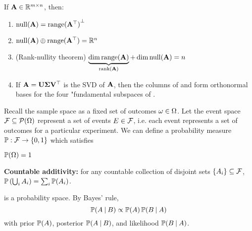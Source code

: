 \documentclass{article}
\begin{document}
\begin{solution}
    \begin{theorem}
    If $\mathbf{A} \in \mathbb{R}^{m \times n}$, then:
    \begin{enumerate}
        \item $\operatorname{null}(\mathbf{A}) = {\operatorname{range}({\mathbf{A}}^\top)}^\bot$
        \item $\operatorname{null}(\mathbf{A}) \mathbin{\oplus} \operatorname{range}({\mathbf{A}}^\top) = \mathbb{R}^n$
        \item (Rank-nullity theorem) $\underbrace{\dim \operatorname{range}(\mathbf{A})}_{\operatorname{rank}(\mathbf{A})} + \dim \operatorname{null}(\mathbf{A}) = n$
        \item If $\mathbf{A} = \mathbf{U} \mathbf{\Sigma} {\mathbf{V}}^\top$ is the SVD of $\mathbf{A}$, then the columns of  and  form orthonormal bases for the four "fundamental subspaces of .
    \end{enumerate}
    \end{theorem}

    Recall the sample space \samplespace as a fixed set of outcomes $\omega \in \Omega$. Let the event space $\mathcal{F} \subseteq \mathcal{P}(\Omega)$ represent a set of events $E \in \mathcal{F}$, i.e. each event represents a set of outcomes for a particular experiment. We can define a probability measure $\operatorname{\mathbb{P}} : \mathcal{F} \to \left\{ 0,1 \right\}$ which satisfies \begin{enumerate*}
        \item $\operatorname{\mathbb{P}}(\Omega) = 1$
        \item \textbf{Countable additivity:} for any countable collection of disjoint sets $\left\{ A_i \right\} \subseteq \mathcal{F}$, $\operatorname{\mathbb{P}}\left(\bigcup_i A_i \right) = \sum_i \operatorname{\mathbb{P}}(A_i)$.
    \end{enumerate*}
    \probspace is a probability space. By Bayes' rule, $$\operatorname{\mathbb{P}}(A \mathbin{\mid} B) \propto \operatorname{\mathbb{P}}(A) \operatorname{\mathbb{P}}(B \mathbin{\mid} A)$$ with prior $\operatorname{\mathbb{P}}(A)$, posterior $\operatorname{\mathbb{P}}(A \mathbin{\mid} B)$, and likelihood $\operatorname{\mathbb{P}}(B \mathbin{\mid} A)$.


\end{solution}
\end{document}
